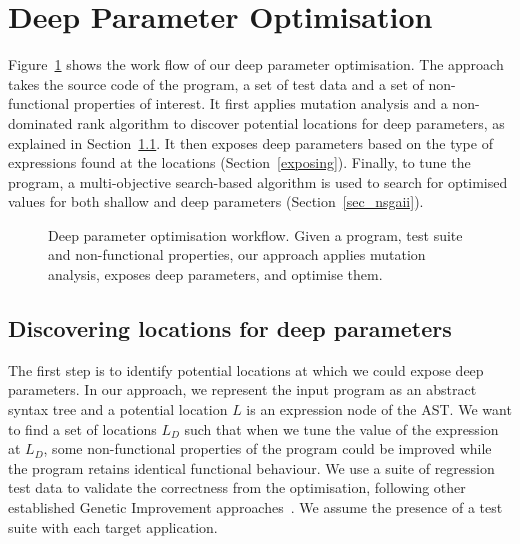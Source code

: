 \section{Deep Parameter Optimisation}
\label{sec_deep_parameter_optimisation}

Figure~\ref{system} shows the work flow of our deep parameter optimisation. The approach takes the source code of the program, a set of test data and a set of non-functional properties of interest. 
It first applies mutation analysis and a non-dominated rank algorithm to discover potential locations for deep parameters, as explained in Section~\ref{discovering}. It then exposes deep parameters based on the type of expressions found at the locations (Section~\ref{exposing}). Finally, to tune the program, a multi-objective search-based algorithm is used to search for optimised values for both shallow and deep parameters (Section~\ref{sec_nsgaii}).

\begin{figure}[htbp]
\centering
{}
\vspace{-2em}
\caption{Deep parameter optimisation workflow. Given a program, test suite and non-functional properties, our approach applies mutation analysis, exposes deep parameters, and optimise them.}\label{system}
\end{figure}

\subsection{Discovering locations for deep parameters}
\label{discovering}
The first step is to identify potential locations at which we could expose deep parameters. 
In our approach, we represent the input program as an abstract syntax tree and a potential location $L$ is an expression node of the AST. 
We want to find a set of locations $L_D$ such that when we tune the value of the expression at $L_D$, some non-functional properties of the program could be improved while the program retains identical functional behaviour.
We use a suite of regression test data to validate the correctness from the optimisation, following other established Genetic Improvement approaches~\cite{justyna2013, Langdon:2014:IMI:2576768.2598244}. We assume the presence of a test suite with each target application.

